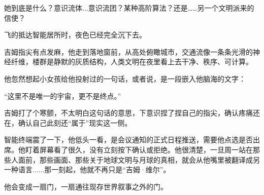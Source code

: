 她到底是什么？意识流体...意识流团？某种高阶算法？还是……另一个文明派来的信使？

飞的抵达智能居所时，夜色已经完全沉下去。

吉姆指尖有点发麻，他走到落地窗前，从高处俯瞰城市，交通流像一条条光滑的神经纤维，楼群是静默的灰质结构，人类文明在夜里看上去干净、秩序、可计算。

他忽然想起小女孩给他投射过的一句话，或者说，是一段嵌入他脑海的文字：

“这里不是唯一的宇宙，更不是终点。”

吉姆打了个寒颤，不太明白这句话的意思，下意识捏了捏自己的指尖，确认疼痛还在，确认自己此刻还“属于”现实这一侧。

智能终端震了一下，他低头一看，是会议通知的正式日程推送，需要他点选是否出席。他盯着屏幕看了很久，没有立刻按下确认或拒绝。他很清楚，一旦周一站在那些人面前，那些画面、那些关于地球文明与月球的真相，就会从他嘴里被翻译成另一种语言......那一刻起，他就不再只是“吉姆·维尔”。

他会变成一扇门，一扇通往现存世界叙事之外的门。
